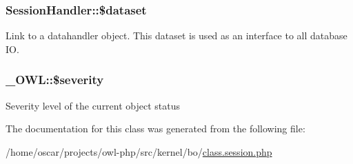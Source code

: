 \subsubsection[{\$dataset}]{\setlength{\rightskip}{0pt plus 5cm}SessionHandler::\$dataset}\label{classSessionHandler_a74c46fcfbadd4c4e6bacc73ddf350056}
Link to a datahandler object. This dataset is used as an interface to all database IO. 
\subsubsection[{\$severity}]{\setlength{\rightskip}{0pt plus 5cm}\_\-OWL::\$severity}\label{class__OWL_ad26b40a9dbbacb33e299b17826f8327c}
Severity level of the current object status 

The documentation for this class was generated from the following file:\begin{DoxyCompactItemize}
\item 
/home/oscar/projects/owl-\/php/src/kernel/bo/\hyperlink{class_8session_8php}{class.session.php}\end{DoxyCompactItemize}
